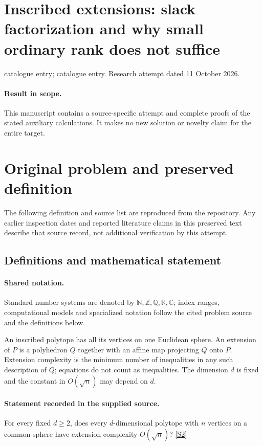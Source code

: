 \documentclass[11pt]{article}
\begin{document}
\section*{Inscribed extensions: slack factorization and why small ordinary rank does not suffice}
\noindent catalogue entry; catalogue entry. Research attempt dated 11 October 2026.
\paragraph{Result in scope.}This manuscript contains a source-specific attempt and complete proofs of the stated auxiliary calculations. It makes no new solution or novelty claim for the entire target.
\section{Original problem and preserved definition}
The following definition and source list are reproduced from the repository. Any earlier inspection dates and reported literature claims in this preserved text describe that source record, not additional verification by this attempt.
\subsection{Definitions and mathematical statement}

\paragraph{Shared notation.}Standard number systems are denoted by $\mathbb N,\mathbb Z,\mathbb Q,\mathbb R,\mathbb C$; index ranges, computational models and specialized notation follow the cited problem source and the definitions below.


An inscribed polytope has all its vertices on one Euclidean sphere. An extension of $P$ is a polyhedron $Q$ together with an affine map projecting $Q$ onto $P$. Extension complexity is the minimum number of inequalities in any such description of $Q$; equations do not count as inequalities. The dimension $d$ is fixed and the constant in $O(\sqrt n)$ may depend on $d$.
\paragraph{Statement recorded in the supplied source.}
For every fixed $d\geq2$, does every $d$-dimensional polytope with $n$ vertices on a common sphere have extension complexity $O(\sqrt n)$? \href{https://doi.org/10.4171/owr/2021/53}{[S2]}
\end{document}
